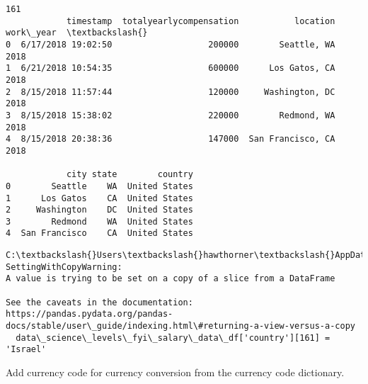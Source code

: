\documentclass[11pt]{article}
\begin{document}
    \begin{Verbatim}[commandchars=\\\{\}]
161
            timestamp  totalyearlycompensation           location  work\_year  \textbackslash{}
0  6/17/2018 19:02:50                   200000        Seattle, WA       2018
1  6/21/2018 10:54:35                   600000      Los Gatos, CA       2018
2  8/15/2018 11:57:44                   120000     Washington, DC       2018
3  8/15/2018 15:38:02                   220000        Redmond, WA       2018
4  8/15/2018 20:38:36                   147000  San Francisco, CA       2018

            city state        country
0        Seattle    WA  United States
1      Los Gatos    CA  United States
2     Washington    DC  United States
3        Redmond    WA  United States
4  San Francisco    CA  United States
    \end{Verbatim}

    \begin{Verbatim}[commandchars=\\\{\}]
C:\textbackslash{}Users\textbackslash{}hawthorner\textbackslash{}AppData\textbackslash{}Local\textbackslash{}Temp\textbackslash{}ipykernel\_22188\textbackslash{}3070310417.py:17:
SettingWithCopyWarning:
A value is trying to be set on a copy of a slice from a DataFrame

See the caveats in the documentation: https://pandas.pydata.org/pandas-
docs/stable/user\_guide/indexing.html\#returning-a-view-versus-a-copy
  data\_science\_levels\_fyi\_salary\_data\_df['country'][161] = 'Israel'
    \end{Verbatim}

    Add currency code for currency conversion from the currency code
dictionary.
\end{document}
